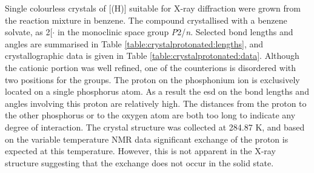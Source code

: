 


Single colourless crystals of [\tButhixantphos(H)] suitable for X-ray diffraction were grown from the reaction mixture in benzene.  The compound crystallised with a benzene solvate, as 2[\tButhixantphos{}\ce{(H)]CPh(SO2CF3)2}$\cdot{}$ in the monoclinic space group \emph{P}2/\emph{n}.  Selected bond lengths and angles are summarised in Table \ref{table:crystalprotonated:lengths}, and crystallographic data is given in Table \ref{table:crystalprotonated:data}.  Although the cationic portion was well refined, one of the counterions is disordered with two positions for the  groups.  The proton on the phosphonium ion is exclusively located on a single phosphorus atom.  As a result the \gls{esd} on the bond lengths and angles involving this proton are relatively high.  The distances from the proton to the other phosphorus or to the oxygen atom are both too long to indicate any degree of interaction.  The crystal structure was collected at 284.87 K, and based on the variable temperature NMR data significant exchange of the proton is expected at this temperature.  However, this is not apparent in the X-ray structure suggesting that the exchange does not occur in the solid state.  


